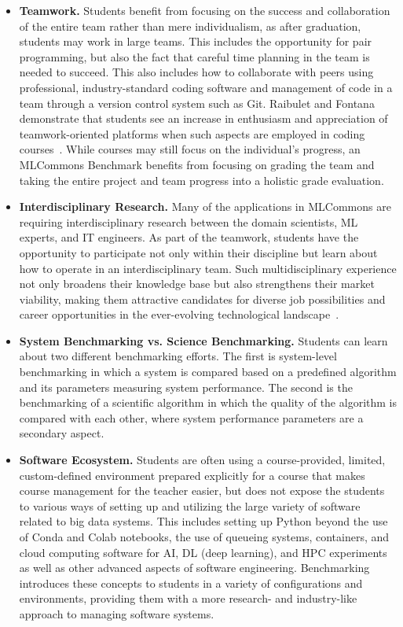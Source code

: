 \documentclass[utf8]{FrontiersinVancouver} %
\begin{document}
\begin{itemize}


\item {\bf Teamwork.} Students benefit from focusing on the success and collaboration of the entire team rather than mere individualism, as after graduation, students may work in large teams. This includes the opportunity for pair programming, but also the fact that careful time planning in the team is needed to succeed. This also includes how to collaborate with peers using professional, industry-standard coding software and management of code in a team through a version control system such as Git. Raibulet and Fontana demonstrate that students see an increase in enthusiasm and appreciation of teamwork-oriented platforms when such aspects are employed in coding courses~\cite{raibulet}. While courses may still focus on the individual's progress, an MLCommons Benchmark benefits from focusing on grading the team and taking the entire project and team progress into a holistic grade evaluation.

\item {\bf Interdisciplinary Research.} Many of the applications in MLCommons are requiring interdisciplinary research between the domain scientists, ML experts, and IT engineers. As part of the teamwork, students have the opportunity to participate not only within their discipline but learn about how to operate in an interdisciplinary team. Such multidisciplinary experience not only broadens their knowledge base but also strengthens their market viability, making them attractive candidates for diverse job possibilities and career opportunities in the ever-evolving technological landscape~\cite{zeidmane}.

\item {\bf System Benchmarking vs. Science Benchmarking.} Students can learn about two different benchmarking efforts. The first is system-level benchmarking in which a system is compared based on a predefined algorithm and its parameters measuring system performance. The second is the benchmarking of a scientific algorithm in which the quality of the algorithm is compared with each other, where system performance parameters are a secondary aspect.

\item {\bf Software Ecosystem.} Students are often using a course-provided, limited, custom-defined environment prepared explicitly for a course that makes course management for the teacher easier, but does not expose the students to various ways of setting up and utilizing the large variety of software related to big data systems. This includes setting up Python beyond the use of Conda and Colab notebooks, the use of queueing systems, containers, and cloud computing software for AI, DL (deep learning), and HPC experiments as well as other advanced aspects of software engineering. Benchmarking introduces these concepts to students in a variety of configurations and environments, providing them with a more research- and industry-like approach to managing software systems.


\end{itemize}
\end{document}

